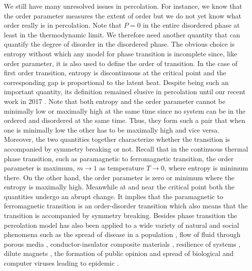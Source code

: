\documentclass[twocolumn,showpacs,preprintnumbers,amsmath,amssymb]{article}
\begin{document}
We still have many unresolved issues in percolation.  For instance, we know that the
order parameter measures the extent of order but we do not yet 
know what order really is in percolation. Note that $P=0$
in the entire disordered phase at least in the thermodynamic limit. We therefore need another
quantity that can quantify the degree of disorder in the disordered phase. 
The obvious choice is entropy without which
any model for phase transition is incomplete since, like order parameter, it is also used to define
the order of transition. In the case of first order transition, entropy is discontinuous
at the critical point and the corresponding gap is proportional to the latent heat.
Despite being such an important quantity, its definition remained elusive in percolation until our 
recent work in 2017 \cite{ref.hassan_didar, ref.hassan_sabbir}. 
 Note that both entropy and the order
parameter cannot be minimally low or maximally high at the same time since no system 
can be in the ordered and disordered at the same time. Thus, they form such a pair that 
when one is minimally low the other has to be maximally
high and vice versa. Moreover, the two quantities together characterize whether the transition 
is accompanied by symmetry breaking or not. 
Recall that in the continuous thermal phase transition, such as paramagnetic to 
ferromagnetic transition, the order parameter is maximum, $m\rightarrow 1$ 
as temperature $T\rightarrow 0$, where entropy is minimum there. On the other hand, the order parameter 
is zero or minimum where the entropy is maximally high. Meanwhile at and near the critical 
point both the quantities undergo an abrupt change. It implies that the paramagnetic
to ferromagnetic transition is an order-disorder transition which also means that the transition
is accompanied by symmetry breaking. Besides phase transition the percolation model 
has also been applied to a wide variety of natural and social phenomena  such as the spread of
disease in a population \cite{ref.Murray}, flow of fluid through porous media \cite{ref.fluids}, 
conductor-insulator composite materials \cite{ref.McLachlan}, resilience of systems \cite{ref.barabasi_1, ref.pastor}, 
dilute magnets  \cite{ref.Bergqvist}, the formation of public opinion \cite{ref.Watts, ref.Shao, ref.opinon_1}
and spread of biological and computer viruses leading to epidemic \cite{ref.Newman_virus, ref.Moore_virus}.
\end{document}
